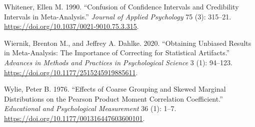 \documentclass[
  letterpaper,
  DIV=11,
  numbers=noendperiod]{scrreprt}
\newlength{\cslhangindent}
\newlength{\cslentryspacingunit} %
\newenvironment{CSLReferences}[2] %
 {%
  \setlength{\parindent}{0pt}
  \ifodd #1
  \let\oldpar\par
  \def\par{\hangindent=\cslhangindent\oldpar}
  \fi
  \setlength{\parskip}{#2\cslentryspacingunit}
 }%
 {}
\begin{document}
\begin{CSLReferences}{1}{0}
\leavevmode{}%
Whitener, Ellen M. 1990. {``Confusion of Confidence Intervals and
Credibility Intervals in Meta-Analysis.''} \emph{Journal of Applied
Psychology} 75 (3): 315--21.
\url{https://doi.org/10.1037/0021-9010.75.3.315}.

\leavevmode{}%
Wiernik, Brenton M., and Jeffrey A. Dahlke. 2020. {``Obtaining Unbiased
Results in Meta-Analysis: The Importance of Correcting for Statistical
Artifacts.''} \emph{Advances in Methods and Practices in Psychological
Science} 3 (1): 94--123. \url{https://doi.org/10.1177/2515245919885611}.

\leavevmode{}%
Wylie, Peter B. 1976. {``Effects of Coarse Grouping and Skewed Marginal
Distributions on the Pearson Product Moment Correlation Coefficient.''}
\emph{Educational and Psychological Measurement} 36 (1): 1--7.
\url{https://doi.org/10.1177/001316447603600101}.

\end{CSLReferences}
\end{document}
